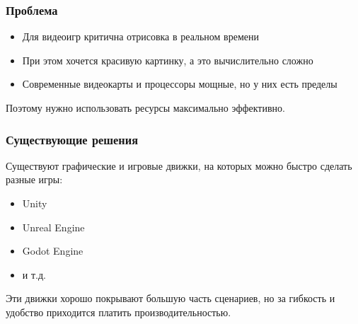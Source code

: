 \begin{frame}
    \frametitle{Проблема}
    \begin{itemize}
        \item Для видеоигр критична отрисовка в реальном времени
        \item При этом хочется красивую картинку,
        а это вычислительно сложно
        \item Современные видеокарты и процессоры мощные,
        но у них есть пределы
    \end{itemize}

    \bigskip

    Поэтому нужно использовать
    ресурсы максимально эффективно.
\end{frame}

\begin{frame}
    \frametitle{Существующие решения}
    Существуют графические и игровые движки,
    на которых можно быстро сделать разные игры:
    \begin{itemize}
        \item Unity
        \item Unreal Engine
        \item Godot Engine
        \item и т.д.
    \end{itemize}

    \bigskip

    Эти движки хорошо покрывают большую часть сценариев,
    но за гибкость и удобство приходится платить
    производительностью.
\end{frame}
